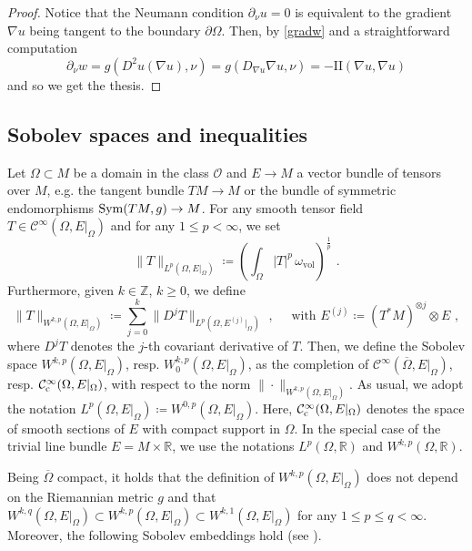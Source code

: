 \documentclass[10pt, a4paper, reqno, oneside]{amsart}
\theoremstyle{plain}
\theoremstyle{definition}
\theoremstyle{plain}
\theoremstyle{definition}
\theoremstyle{plain}
\renewcommand{\=}{:=}
\begin{document}
\begin{proof} Notice that the Neumann condition $\partial_{\nu} u =0$ is equivalent to the gradient $\nabla u$ being tangent to the boundary $\partial \Omega$. Then, by \eqref{gradw} and a straightforward computation
$$
\partial_\nu w = g(D^2u(\nabla u), \nu) = g(D_{\nabla u}\nabla u,\nu) = -\mathrm{II}(\nabla u,\nabla u)
$$
and so we get the thesis.
\end{proof}

\subsection{Sobolev spaces and inequalities} \hfill \par

Let $\Omega \subset M$ be a domain in the class $\mathcal{O}$ and $E \to M$ a vector bundle of tensors over $M$, e.g. the tangent bundle $TM \to M$ or the bundle of symmetric endomorphisms ${\rm Sym}(TM,g) \to M$. For any smooth tensor field $T \in \mathcal{C}^{\infty}(\Omega,E|_{\Omega})$ and for any $1 \leq p < \infty$, we set
$$
\| T \|_{L^p(\Omega,E|_{\Omega})} \coloneqq \left({\textstyle\int_{\Omega}} |T|^p \,\omega_{\mathrm{vol}} \right)^{\frac1p} \,\, .
$$
Furthermore, given $k \in \mathbb{Z}$, $k \geq0$, we define
$$
\| T \|_{W^{k,p}(\Omega,E|_{\Omega})} \coloneqq \sum_{j=0}^k \| D^j T \|_{L^p(\Omega,E^{(j)}|_{\Omega})} \,\, , \quad \text{ with } E^{(j)} \coloneqq (T^*M)^{\otimes j} \otimes E \,\, ,
$$
where $D^j T$ denotes the $j$-th covariant derivative of $T$. Then, we define the Sobolev space $W^{k,p}(\Omega,E|_{\Omega})$, resp. $W^{k,p}_0(\Omega,E|_{\Omega})$, as the completion of $\mathcal{C}^{\infty}(\overline{\Omega},E|_{\Omega})$, resp. $\mathcal{C}^{\infty}_{\rm c}(\Omega,E|_{\Omega})$, with respect to the norm $\| \cdot \|_{W^{k,p}(\Omega,E|_{\Omega})}$. As usual, we adopt the notation $L^p(\Omega,E|_{\Omega}) \coloneqq W^{0,p}(\Omega,E|_{\Omega})$. Here, $\mathcal{C}^{\infty}_{\rm c}(\Omega,E|_{\Omega})$ denotes the space of smooth sections of $E$ with compact support in $\Omega$. In the special case of the trivial line bundle $E=M \times \mathbb{R}$, we use the notations $L^p(\Omega,\mathbb{R})$ and $W^{k,p}(\Omega,\mathbb{R})$. \smallskip

Being $\overline{\Omega}$ compact, it holds that the definition of $W^{k,p}(\Omega,E|_{\Omega})$ does not depend on the Riemannian metric $g$ \cite[Proposition 2.2]{HebeyBook} and that $W^{k,q}(\Omega,E|_{\Omega}) \subset W^{k,p}(\Omega,E|_{\Omega}) \subset W^{k,1}(\Omega,E|_{\Omega})$ for any $1 \leq p \leq q < \infty$. Moreover, the following Sobolev embeddings hold (see \cite[Chapter 10]{HebeyBook}).
\end{document}
